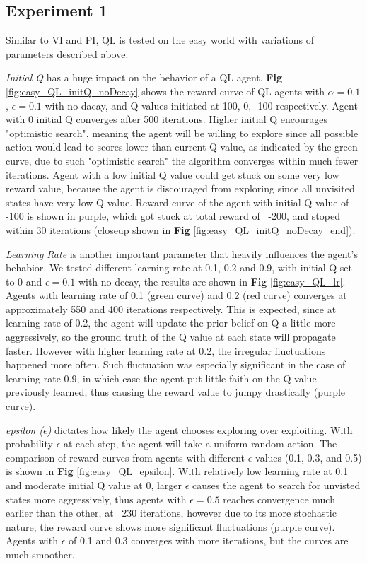 \documentclass[10pt]{article}
\begin{document}
\subsection{Experiment 1} \label{results1}
Similar to VI and PI, QL is tested on the easy world with variations of parameters described above.\par
\bigbreak
\noindent
\textit{Initial Q} has a huge impact on the behavior of a QL agent. \textbf{Fig} \ref{fig:easy_QL_initQ_noDecay} shows the reward curve of QL agents with $\alpha=0.1$, $\epsilon=0.1$ with no dacay, and Q values initiated at 100, 0, -100 respectively. Agent with 0 initial Q converges after 500 iterations. Higher initial Q encourages "optimistic search", meaning the agent will be willing to explore since all possible action would lead to scores lower than current Q value, as indicated by the green curve, due to such "optimistic search" the algorithm converges within much fewer iterations. Agent with a low initial Q value could get stuck on some very low reward value, because the agent is discouraged from exploring since all unvisited states have very low Q value. Reward curve of the agent with initial Q value of -100 is shown in purple, which got stuck at total reward of ~-200, and stoped within 30 iterations (closeup shown in \textbf{Fig} \ref{fig:easy_QL_initQ_noDecay_end}).\par
\bigbreak
\noindent
\textit{Learning Rate} is another important parameter that heavily influences the agent's behabior. We tested different learning rate at 0.1, 0.2 and 0.9, with initial Q set to 0 and $\epsilon=0.1$ with no decay, the results are shown in \textbf{Fig} \ref{fig:easy_QL_lr}. Agents with learning rate of 0.1 (green curve) and 0.2 (red curve) converges at approximately 550 and 400 iterations respectively. This is expected, since at learning rate of 0.2, the agent will update the prior belief on Q a little more aggressively, so the ground truth of the Q value at each state will propagate faster. However with higher learning rate at 0.2, the irregular fluctuations happened more often. Such fluctuation was especially significant in the case of learning rate 0.9, in which case the agent put little faith on the Q value previously learned, thus causing the reward value to jumpy drastically (purple curve).\par
\bigbreak
\noindent
\textit{epsilon ($\epsilon$)} dictates how likely the agent chooses exploring over exploiting.  With probability $\epsilon$ at each step, the agent will take a uniform random action. The comparison of reward curves from agents with different $\epsilon$ values (0.1, 0.3, and 0.5) is shown in \textbf{Fig} \ref{fig:easy_QL_epsilon}. With relatively low learning rate at 0.1 and moderate initial Q value at 0, larger $\epsilon$ causes the agent to search for unvisted states more aggressively, thus agents with $\epsilon=0.5$ reaches convergence much earlier than the other, at ~230 iterations, however due to its more stochastic nature, the reward curve shows more significant fluctuations (purple curve). Agents with $\epsilon$ of 0.1 and 0.3 converges with more iterations, but the curves are much smoother.\par
\end{document}
